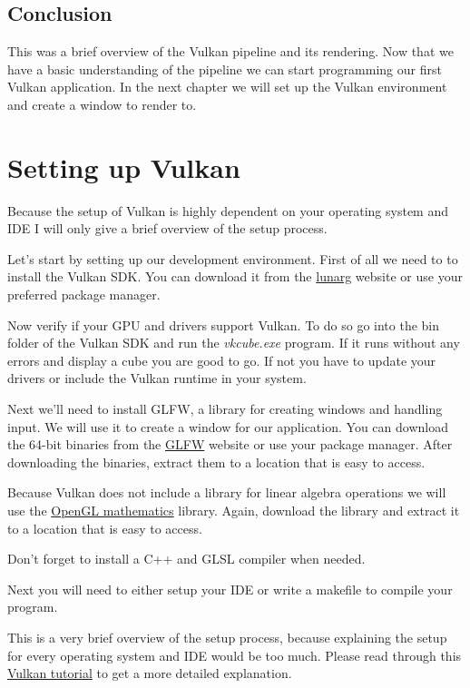 \documentclass[12pt]{report} \usepackage{preamble}
\begin{document}
\section{Conclusion}

This was a brief overview of the Vulkan pipeline and its rendering.
Now that we have a basic understanding of the pipeline we can start
programming our first Vulkan application. In the next chapter we will set up
the Vulkan environment and create a window to render to.

\chapter{Setting up Vulkan}

Because the setup of Vulkan is highly dependent on your operating system and IDE
I will only give a brief overview of the setup process.

Let's start by setting up our development environment.
First of all we need to to install the Vulkan SDK. You can download it from the
\href{https://Vulkan.lunarg.com/sdk/home}{lunarg} website or use your preferred package manager.

Now verify if your \ac{GPU} and drivers support Vulkan.
To do so go into the bin folder of the Vulkan SDK and run the
\textit{vkcube.exe} program. If it runs without any errors and display a cube you are good to go.
If not you have to update your drivers or include the Vulkan runtime in your system.

Next we'll need to install \ac{GLFW}, a library for creating windows and handling input.
We will use it to create a window for our application.
You can download the 64-bit binaries from the \href{https://www.glfw.org/download.html}{GLFW} website or
use your package manager. After downloading the binaries,
extract them to a location that is easy to access.

Because Vulkan does not include a library for
linear algebra operations we will use the \href{https://github.com/g-truc/glm}{OpenGL mathematics}
library. Again, download the library and extract it to a location that is easy to access.

Don't forget to install a C++ and \ac{GLSL} compiler when needed.

Next you will need to either setup your IDE or write a makefile to compile your program.

This is a very brief overview of the setup process,
because explaining the setup for every operating system and IDE would be too much.
Please read through this \href{https://Vulkan-tutorial.com/development_environment}{Vulkan tutorial}
to get a more detailed explanation.
\end{document}
